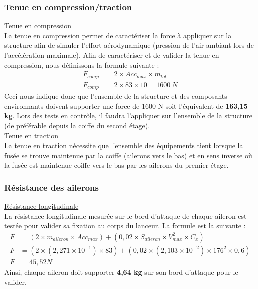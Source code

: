 \newpage


\subsubsection{Tenue en compression/traction}
\underline{Tenue en compression}\\
La tenue en compression permet de caractériser la force à appliquer sur la structure afin de simuler l'effort aérodynamique (pression de l'air ambiant lors de l'accélération maximale).
Afin de caractériser et de valider la tenue en compression, nous définissons la formule suivante :
\begin{align*}
    F_{comp} &= 2 \times Acc_{max} \times m_{tot} \\
    F_{comp} &= 2 \times 83 \times 10 = 1600\ N
\end{align*}
Ceci nous indique donc que l'ensemble de la structure et des composants environnants doivent supporter une force de 1600 N soit l'équivalent de \textbf{163,15 kg}. Lors des tests en contrôle, il faudra l'appliquer sur l'ensemble de la structure (de préférable depuis la coiffe du second étage).\\

\underline{Tenue en traction}\\
La tenue en traction nécessite que l'ensemble des équipements tient lorsque la fusée se trouve maintenue par la coiffe (ailerons vers le bas) et en sens inverse où la fusée est maintenue coiffe vers le bas par les ailerons du premier étage.


\subsubsection{Résistance des ailerons}
\underline{Résistance longitudinale}\\
La résistance longitudinale mesurée sur le bord d'attaque de chaque aileron est testée pour valider sa fixation au corps du lanceur. La formule est la suivante :
\begin{align*}
    F &= (2 \times m_{aileron} \times Acc_{max}) + (0,02 \times S_{aileron} \times V_{max}^2 \times C_x)\\
    F &= (2 \times (2,271\times 10^{-1}) \times 83) + (0,02 \times (2,103\times 10^{-2}) \times 176^2 \times 0,6)\\
    F &= 45,52 N
\end{align*}
Ainsi, chaque aileron doit supporter \textbf{4,64 kg} sur son bord d'attaque pour le valider.\\

